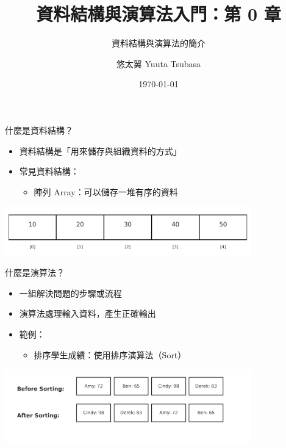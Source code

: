 \documentclass{beamer}
\begin{document}
\title{資料結構與演算法入門：第 0 章}
\subtitle{資料結構與演算法的簡介}
\author{悠太翼 Yuuta Tsubasa}
\date{\today}

\frame{\titlepage}

\begin{frame}{什麼是資料結構？}
\begin{itemize}
    \item 資料結構是「用來儲存與組織資料的方式」
    \item 常見資料結構：
    \begin{itemize}
        \item 陣列 Array：可以儲存一堆有序的資料
    \end{itemize}
\end{itemize}
\begin{center}
    \includegraphics[width=0.8\textwidth]{images/array_example.png}
\end{center}
\end{frame}

\begin{frame}{什麼是演算法？}
\begin{itemize}
    \item 一組解決問題的步驟或流程
    \item 演算法處理輸入資料，產生正確輸出
    \item 範例：
    \begin{itemize}
        \item 排序學生成績：使用排序演算法（Sort）
    \end{itemize}
\end{itemize}
\begin{center}
    \includegraphics[width=0.8\textwidth]{images/sort_example_students.png}
\end{center}
\end{frame}
\end{document}
